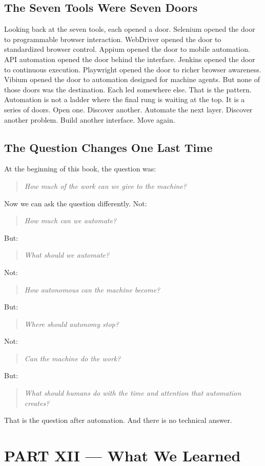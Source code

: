 \documentclass[11pt,twoside]{book}
\begin{document}
\section*{The Seven Tools Were Seven Doors}

Looking back at the seven tools, each opened a door.
Selenium opened the door to programmable browser interaction.
WebDriver opened the door to standardized browser control.
Appium opened the door to mobile automation.
API automation opened the door behind the interface.
Jenkins opened the door to continuous execution.
Playwright opened the door to richer browser awareness.
Vibium opened the door to automation designed for machine agents.
But none of those doors was the destination.
Each led somewhere else.
That is the pattern.
Automation is not a ladder where the final rung is waiting at the top.
It is a series of doors.
Open one.
Discover another.
Automate the next layer.
Discover another problem.
Build another interface.
Move again.

\section*{The Question Changes One Last Time}

At the beginning of this book, the question was:
\begin{quote}
\emph{How much of the work can we give to the machine?}
\end{quote}
Now we can ask the question differently.
Not:
\begin{quote}
\emph{How much can we automate?}
\end{quote}
But:
\begin{quote}
\emph{What should we automate?}
\end{quote}
Not:
\begin{quote}
\emph{How autonomous can the machine become?}
\end{quote}
But:
\begin{quote}
\emph{Where should autonomy stop?}
\end{quote}
Not:
\begin{quote}
\emph{Can the machine do the work?}
\end{quote}
But:
\begin{quote}
\emph{What should humans do with the time and attention that automation creates?}
\end{quote}
That is the question after automation.
And there is no technical answer.

\chapter*{PART XII — What We Learned}
\end{document}

